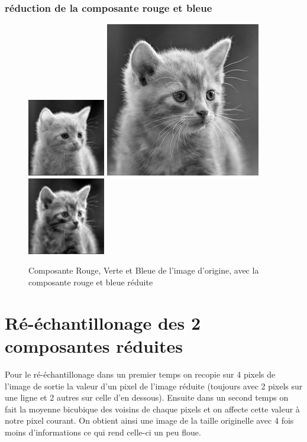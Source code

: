 \documentclass{article}
\begin{document}
\subsubsection*{réduction de la composante rouge et bleue}

\begin{figure}[h]
\centerline{\includegraphics[scale=0.8]{./rendus/ReduceRed.png} \includegraphics[scale=0.6]{./rendus/Green.png} \includegraphics[scale=0.8]{./rendus/ReduceBlue.png} }
\caption{Composante Rouge, Verte et Bleue de l'image d'origine, avec la composante rouge et bleue réduite}
\end{figure}

\newpage
\section{Ré-échantillonage des 2 composantes réduites}
Pour le ré-échantillonage dans un premier temps on recopie sur 4 pixels de l'image de sortie la valeur d'un pixel de l'image réduite (toujours avec 2 pixels sur une ligne et 2 autres sur celle d'en dessous). Ensuite dans un second temps on fait la moyenne bicubique des voisins de chaque pixels et on affecte cette valeur à notre pixel courant.
On obtient ainsi une image de la taille originelle avec 4 fois moins d'informations ce qui rend celle-ci un peu floue.
\end{document}
